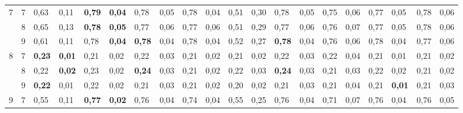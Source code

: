 \documentclass[conference]{IEEEtran}
\begin{document}
\begin{table*}[]
\begin{tabular}{|cl|ll|ll|ll|ll|ll|ll|ll|ll|ll|}
		\multicolumn{1}{|c|}{\multirow{3}{*}{7}} & 7 & \multicolumn{1}{l|}{0,63} & 0,11 & \multicolumn{1}{l|}{\textbf{0,79}} & \textbf{0,04} & \multicolumn{1}{l|}{0,78} & 0,05 & \multicolumn{1}{l|}{0,78} & 0,04 & \multicolumn{1}{l|}{0,51} & 0,30 & \multicolumn{1}{l|}{0,78} & 0,05 & \multicolumn{1}{l|}{0,75} & 0,06 & \multicolumn{1}{l|}{0,77} & 0,05 & \multicolumn{1}{l|}{0,78} & 0,06 \\ \cline{2-20} 
		\multicolumn{1}{|c|}{} & 8 & \multicolumn{1}{l|}{0,65} & 0,13 & \multicolumn{1}{l|}{\textbf{0,78}} & \textbf{0,05} & \multicolumn{1}{l|}{0,77} & 0,06 & \multicolumn{1}{l|}{0,77} & 0,06 & \multicolumn{1}{l|}{0,51} & 0,29 & \multicolumn{1}{l|}{0,77} & 0,06 & \multicolumn{1}{l|}{0,76} & 0,07 & \multicolumn{1}{l|}{0,77} & 0,05 & \multicolumn{1}{l|}{0,78} & 0,06 \\ \cline{2-20} 
		\multicolumn{1}{|c|}{} & 9 & \multicolumn{1}{l|}{0,61} & 0,11 & \multicolumn{1}{l|}{0,78} & \textbf{0,04} & \multicolumn{1}{l|}{\textbf{0,78}} & 0,04 & \multicolumn{1}{l|}{0,78} & 0,04 & \multicolumn{1}{l|}{0,52} & 0,27 & \multicolumn{1}{l|}{\textbf{0,78}} & 0,04 & \multicolumn{1}{l|}{0,76} & 0,06 & \multicolumn{1}{l|}{0,78} & 0,04 & \multicolumn{1}{l|}{0,77} & 0,06 \\ \hline
		\multicolumn{1}{|c|}{\multirow{3}{*}{8}} & 7 & \multicolumn{1}{l|}{\textbf{0,23}} & \textbf{0,01} & \multicolumn{1}{l|}{0,21} & 0,02 & \multicolumn{1}{l|}{0,22} & 0,03 & \multicolumn{1}{l|}{0,21} & 0,02 & \multicolumn{1}{l|}{0,21} & 0,02 & \multicolumn{1}{l|}{0,22} & 0,03 & \multicolumn{1}{l|}{0,22} & 0,04 & \multicolumn{1}{l|}{0,21} & 0,01 & \multicolumn{1}{l|}{0,21} & 0,02 \\ \cline{2-20} 
		\multicolumn{1}{|c|}{} & 8 & \multicolumn{1}{l|}{0,22} & \textbf{0,02} & \multicolumn{1}{l|}{0,23} & 0,02 & \multicolumn{1}{l|}{\textbf{0,24}} & 0,03 & \multicolumn{1}{l|}{0,21} & 0,02 & \multicolumn{1}{l|}{0,22} & 0,03 & \multicolumn{1}{l|}{\textbf{0,24}} & 0,03 & \multicolumn{1}{l|}{0,21} & 0,03 & \multicolumn{1}{l|}{0,22} & 0,02 & \multicolumn{1}{l|}{0,21} & 0,02 \\ \cline{2-20} 
		\multicolumn{1}{|c|}{} & 9 & \multicolumn{1}{l|}{\textbf{0,22}} & 0,01 & \multicolumn{1}{l|}{0,22} & 0,02 & \multicolumn{1}{l|}{0,21} & 0,03 & \multicolumn{1}{l|}{0,21} & 0,02 & \multicolumn{1}{l|}{0,20} & 0,02 & \multicolumn{1}{l|}{0,21} & 0,03 & \multicolumn{1}{l|}{0,21} & 0,04 & \multicolumn{1}{l|}{0,21} & \textbf{0,01} & \multicolumn{1}{l|}{0,21} & 0,03 \\ \hline
		\multicolumn{1}{|c|}{\multirow{3}{*}{9}} & 7 & \multicolumn{1}{l|}{0,55} & 0,11 & \multicolumn{1}{l|}{\textbf{0,77}} & \textbf{0,02} & \multicolumn{1}{l|}{0,76} & 0,04 & \multicolumn{1}{l|}{0,74} & 0,04 & \multicolumn{1}{l|}{0,55} & 0,25 & \multicolumn{1}{l|}{0,76} & 0,04 & \multicolumn{1}{l|}{0,71} & 0,07 & \multicolumn{1}{l|}{0,76} & 0,04 & \multicolumn{1}{l|}{0,76} & 0,05 \\ \cline{2-20} 

\end{tabular}
\end{table*}
\end{document}
